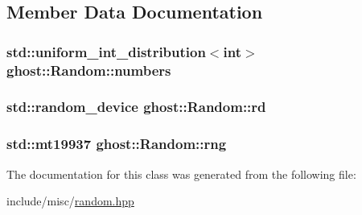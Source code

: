 \subsection{Member Data Documentation}
\hypertarget{classghost_1_1Random_ac32393912fd8109be3f3f61097cec064}{
\subsubsection[{numbers}]{\setlength{\rightskip}{0pt plus 5cm}std\-::uniform\-\_\-int\-\_\-distribution$<$int$>$ ghost\-::\-Random\-::numbers\hspace{0.3cm}{\ttfamily [private]}}}\label{classghost_1_1Random_ac32393912fd8109be3f3f61097cec064}
\hypertarget{classghost_1_1Random_abb2a2b13a77bc4fb48486f7fd8993d05}{
\subsubsection[{rd}]{\setlength{\rightskip}{0pt plus 5cm}std\-::random\-\_\-device ghost\-::\-Random\-::rd\hspace{0.3cm}{\ttfamily [private]}}}\label{classghost_1_1Random_abb2a2b13a77bc4fb48486f7fd8993d05}
\hypertarget{classghost_1_1Random_a875f2ce3cba5e8d1bcf951e0f9d83d00}{
\subsubsection[{rng}]{\setlength{\rightskip}{0pt plus 5cm}std\-::mt19937 ghost\-::\-Random\-::rng\hspace{0.3cm}{\ttfamily [private]}}}\label{classghost_1_1Random_a875f2ce3cba5e8d1bcf951e0f9d83d00}


The documentation for this class was generated from the following file\-:\begin{DoxyCompactItemize}
\item 
include/misc/\hyperlink{random_8hpp}{random.\-hpp}\end{DoxyCompactItemize}
